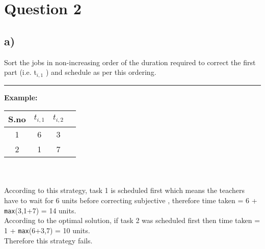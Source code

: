 \documentclass{report}
\begin{document}
 \section*{Question 2}
 \subsection*{a)}
 Sort the jobs in non-increasing order of the duration required to correct the first part (i.e. t$_{i,1}$ ) and schedule as per this ordering.\\
 \noindent\rule[0.5mm]{4cm}{0pt}
 \textbf{Example:}
 \begin{tabular}{|c|c|c|c}
    \hline
      S.no &  $t_{i,1}$ & $t_{i,2}$\\
      \hline
      1 & 6 & 3\\ 
      2 & 1 & 7\\
      \hline
 \end{tabular}\\\vspace*{0.2em}\\
 According to this strategy, task 1 is scheduled first which means the teachers have to wait for 6 units before correcting subjective , therefore time taken = 6 + \texttt{max}(3,1+7) = 14 units.\\
 According to the optimal solution, if task 2 was scheduled first then time taken = 1 + \texttt{max}(6+3,7) = 10 units.\\
 Therefore this strategy fails.
\end{document}

